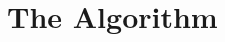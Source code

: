 \documentclass[xcolor={rgb,dvipsnames}]{beamer}		%
\begin{document}
%



\section{The Algorithm}

\begin{frame}
\tableofcontents[currentsection]
\end{frame}



\end{document}
